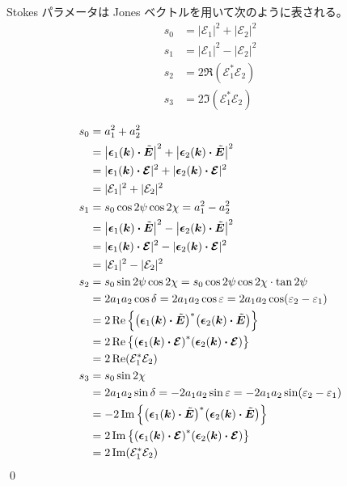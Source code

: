\documentclass[uplatex,dvipdfmx,a4paper,11pt]{jlreq}
\makeatletter
\newcommand{\kk}{\bm{k}}
\newcommand{\ET}{\tilde{\bm{E}}}
\newcommand{\Ec}{\mathcal{E}}
\newcommand{\EC}{\vb*{\mathcal{E}}}
\newcommand{\ee}{\bm{\epsilon}}
\theoremstyle{definition}
\renewenvironment{proof}[1][\proofname]{\par
  \normalfont
  \topsep6\p@\@plus6\p@ \trivlist
  \item[\hskip\labelsep{\bfseries #1}\@addpunct{\bfseries}]\ignorespaces\quad\par
}{%
  \qed\endtrivlist\@endpefalse
}
\renewcommand\proofname{証明}
\makeatother
\begin{document}
\begin{proposition}
  Stokes パラメータは Jones ベクトルを用いて次のように表される。
  \begin{align}
    s_0 & = |\Ec_1|^2 + |\Ec_2|^2 \\
    s_1 & = |\Ec_1|^2 - |\Ec_2|^2 \\
    s_2 & = 2\Re(\Ec_1^*\Ec_2)    \\
    s_3 & = 2\Im(\Ec_1^*\Ec_2)
  \end{align}
\end{proposition}
\begin{proof}
  \begin{align}
    s_0 & = a_1^2 + a_2^2                                                                              \\
        & = \qty|\ee_1(\kk)\vdot\ET|^2 + \qty|\ee_2(\kk)\vdot\ET|^2                                    \\
        & = |\ee_1(\kk)\vdot\EC|^2 + |\ee_2(\kk)\vdot\EC|^2                                            \\
        & = |\Ec_1|^2 + |\Ec_2|^2                                                                      \\
    s_1 & = s_0\cos2\psi\cos2\chi = a_1^2 - a_2^2                                                      \\
        & = \qty|\ee_1(\kk)\vdot\ET|^2 - \qty|\ee_2(\kk)\vdot\ET|^2                                    \\
        & = |\ee_1(\kk)\vdot\EC|^2 - |\ee_2(\kk)\vdot\EC|^2                                            \\
        & = |\Ec_1|^2 - |\Ec_2|^2                                                                      \\
    s_2 & = s_0\sin2\psi\cos2\chi = s_0\cos2\psi\cos2\chi\cdot\tan2\psi                                \\
        & = 2a_1a_2\cos\delta = 2a_1a_2\cos\varepsilon = 2a_1a_2\cos(\varepsilon_2 - \varepsilon_1)    \\
        & = 2\Re\qty{\qty(\ee_1(\kk)\vdot\ET)^*\qty(\ee_2(\kk)\vdot\ET)}                               \\
        & = 2\Re\qty{\qty(\ee_1(\kk)\vdot\EC)^*\qty(\ee_2(\kk)\vdot\EC)}                               \\
        & = 2\Re(\Ec_1^*\Ec_2)                                                                         \\
    s_3 & = s_0\sin2\chi                                                                               \\
        & = 2a_1a_2\sin\delta = -2a_1a_2\sin\varepsilon = - 2a_1a_2\sin(\varepsilon_2 - \varepsilon_1) \\
        & = - 2\Im\qty{\qty(\ee_1(\kk)\vdot\ET)^*\qty(\ee_2(\kk)\vdot\ET)}                             \\
        & = 2\Im\qty{\qty(\ee_1(\kk)\vdot\EC)^*\qty(\ee_2(\kk)\vdot\EC)}                               \\
        & = 2\Im(\Ec_1^*\Ec_2)
  \end{align}
\end{proof}
\end{document}
